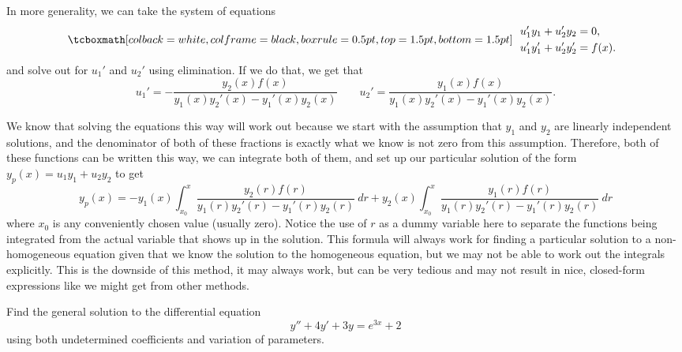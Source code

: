 In more generality, we can take the system of equations 
\begin{equation*}
\mybxbg{~~
\begin{aligned}
& u_1' y_1 + u_2' y_2 = 0 ,\\
& u_1' y_1' + u_2' y_2' = f(x) .
\end{aligned}
~~}
\end{equation*}
and solve out for $u_1'$ and $u_2'$ using elimination. If we do that, we get that
\begin{equation*}
u_1' = -\frac{y_2(x)f(x)}{y_1(x)y_2'(x) - y_1'(x)y_2(x)} \qquad u_2' = \frac{y_1(x)f(x)}{y_1(x)y_2'(x) - y_1'(x)y_2(x)}.
\end{equation*} 

We know that solving the equations this way will work out because we start with the assumption that $y_1$ and $y_2$ are linearly independent solutions, and the denominator of both of these fractions is exactly what we know is not zero from this assumption. Therefore, both of these functions can be written this way, we can integrate both of them, and set up our particular solution of the form $y_p(x) = u_1y_1 + u_2y_2$ to get
\begin{equation}
y_p(x) = -y_1(x)\int_{x_0}^x \frac{y_2(r)f(r)}{y_1(r)y_2'(r) - y_1'(r)y_2(r)}\ dr + y_2(x)\int_{x_0}^x \frac{y_1(r)f(r)}{y_1(r)y_2'(r) - y_1'(r)y_2(r)}\ dr
\label{varpar:eqn}
\end{equation}
where $x_0$ is any conveniently chosen value (usually zero). Notice the use of $r$ as a dummy variable here to separate the functions being integrated from the actual variable that shows up in the solution. This formula will always work for finding a particular solution to a non-homogeneous equation given that we know the solution to the homogeneous equation, but we may not be able to work out the integrals explicitly. This is the downside of this method, it may always work, but can be very tedious and may not result in nice, closed-form expressions like we might get from other methods. 

\begin{example}
Find the general solution to the differential equation
\begin{equation*}
y'' + 4y' + 3y = e^{3x} + 2
\end{equation*}
using both undetermined coefficients and variation of parameters.
\end{example}

